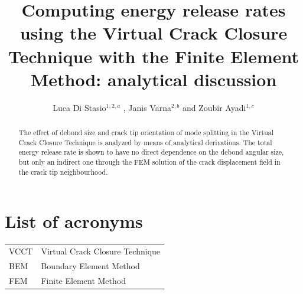\documentclass[a4paper]{jpconf}
\begin{document}

\title{Computing energy release rates using the Virtual Crack Closure Technique with the Finite Element Method: analytical discussion}

\author{Luca Di Stasio$^{1,2,a}$ , Janis Varna$^{2,b}$ and Zoubir Ayadi$^{1,c}$ }

\address{$^{1}$SI2M, IJL, EEIGM, Universit\'e de Lorraine, 6 Rue Bastien Lepage, F-54010 Nancy, France\\$^{2}$Division of Polymer Engineering, Lule\aa\ University of Technology, SE-97187 Lule\aa , Sweden }

{\vspace*{5pt}\address{E-mail: $^{a}$luca.di-stasio@univ-lorraine.fr, $^{b}$janis.varna@ltu.se, $^{c}$zoubir.ayadi@univ-lorraine.fr}}


\begin{abstract}
The effect of debond size and crack tip orientation of mode splitting in the Virtual Crack Closure Technique is analyzed by means of analytical derivations. The total energy release rate is shown to have no direct dependence on the debond angular size, but only an indirect one through the FEM solution of the crack displacement field in the crack tip neighbourhood.
\end{abstract}


\section*{List of acronyms}

\begin{tabular}{ll}
VCCT &  Virtual Crack Closure Technique\\
BEM &  Boundary Element Method\\
FEM &  Finite Element Method\\
\end{tabular}
\end{document}
